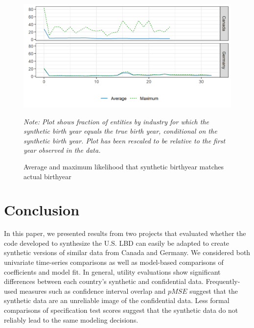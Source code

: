 \documentclass[10pt]{article}
\begin{document}
\begin{figure}[ht]
\includegraphics[width=\linewidth]{r-graphs/fig_conf_both.png}
\caption{Average and maximum likelihood that synthetic birthyear matches actual birthyear\label{fig:Conf.Both}}

\begin{center}
\begin{minipage}{0.7\linewidth}
	\footnotesize \it
Note: Plot shows fraction of entities by industry for which the synthetic birth year equals the true birth year, conditional on the synthetic birth year. Plot has been rescaled to be relative to the first year observed in the data.	
\end{minipage}
\end{center}
\end{figure} 



 \newpage
\section{Conclusion}
\label{sec:conclusion}

In this paper, we presented results from two projects that evaluated whether the code developed to synthesize the U.S. LBD can easily be adapted to create synthetic versions of similar data from Canada and Germany. We considered both univariate time-series comparisons as well as model-based comparisons of coefficients and model fit. In general, utility evaluations show significant differences between each country's synthetic and confidential data. Frequently-used measures such as confidence interval overlap and $pMSE$ suggest that the synthetic data are an unreliable image of the confidential data. Less formal comparisons of specification test scores suggest that the synthetic data do not reliably lead to  the same modeling decisions.
\end{document}
